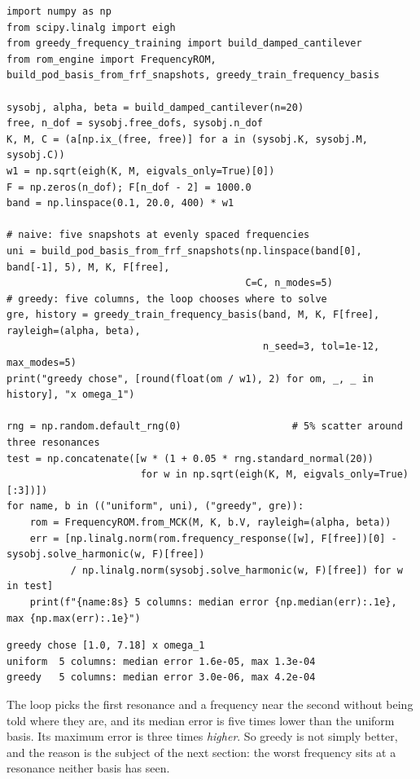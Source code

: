 \begin{lstlisting}[caption={Five evenly spaced snapshots against five greedily chosen ones (run from \texttt{rom\_engine/examples}).},label={lst:fr-try}]
import numpy as np
from scipy.linalg import eigh
from greedy_frequency_training import build_damped_cantilever
from rom_engine import FrequencyROM, build_pod_basis_from_frf_snapshots, greedy_train_frequency_basis

sysobj, alpha, beta = build_damped_cantilever(n=20)
free, n_dof = sysobj.free_dofs, sysobj.n_dof
K, M, C = (a[np.ix_(free, free)] for a in (sysobj.K, sysobj.M, sysobj.C))
w1 = np.sqrt(eigh(K, M, eigvals_only=True)[0])
F = np.zeros(n_dof); F[n_dof - 2] = 1000.0
band = np.linspace(0.1, 20.0, 400) * w1

# naive: five snapshots at evenly spaced frequencies
uni = build_pod_basis_from_frf_snapshots(np.linspace(band[0], band[-1], 5), M, K, F[free],
                                         C=C, n_modes=5)
# greedy: five columns, the loop chooses where to solve
gre, history = greedy_train_frequency_basis(band, M, K, F[free], rayleigh=(alpha, beta),
                                            n_seed=3, tol=1e-12, max_modes=5)
print("greedy chose", [round(float(om / w1), 2) for om, _, _ in history], "x omega_1")

rng = np.random.default_rng(0)                   # 5% scatter around three resonances
test = np.concatenate([w * (1 + 0.05 * rng.standard_normal(20))
                       for w in np.sqrt(eigh(K, M, eigvals_only=True)[:3])])
for name, b in (("uniform", uni), ("greedy", gre)):
    rom = FrequencyROM.from_MCK(M, K, b.V, rayleigh=(alpha, beta))
    err = [np.linalg.norm(rom.frequency_response([w], F[free])[0] - sysobj.solve_harmonic(w, F)[free])
           / np.linalg.norm(sysobj.solve_harmonic(w, F)[free]) for w in test]
    print(f"{name:8s} 5 columns: median error {np.median(err):.1e}, max {np.max(err):.1e}")
\end{lstlisting}

\begin{lstlisting}[numbers=none,language={},keywordstyle={},commentstyle={},frame=single,aboveskip=2pt]
greedy chose [1.0, 7.18] x omega_1
uniform  5 columns: median error 1.6e-05, max 1.3e-04
greedy   5 columns: median error 3.0e-06, max 4.2e-04
\end{lstlisting}

The loop picks the first resonance and a frequency near the second without being told where they are, and its median error is five times lower than the uniform basis. Its maximum error is three times \emph{higher}. So greedy is not simply better, and the reason is the subject of the next section: the worst frequency sits at a resonance neither basis has seen.

